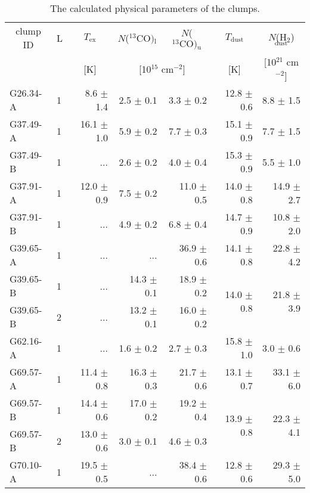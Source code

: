\documentclass[printer]{aa}
\begin{document}
\begin{table*}[t]
	\centering
	\footnotesize
		\caption{The calculated physical parameters of the clumps.}
		\begin{tabular}{l l r r r r r}
		\hline
		\multicolumn{1}{c}{clump ID} & \multicolumn{1}{c}{L} & \multicolumn{1}{c}{$T\mathrm{_{ex}}$} & \multicolumn{1}{c}{$N$($\mathrm{^{13}CO})\mathrm{_{l}}$} & \multicolumn{1}{c}{$N$($\mathrm{^{13}CO})\mathrm{_{u}}$} & \multicolumn{1}{c}{$T\mathrm{_{dust}}$} & \multicolumn{1}{c}{$N$(H$_2$)$\mathrm{_{dust}}$} \\
	\multicolumn{1}{c}{\ } & \multicolumn{1}{c}{\ } &  \multicolumn{1}{c}{[K]} & \multicolumn{2}{c}{[10$^{15}$ cm$^{-2}$]} & \multicolumn{1}{c}{[K]} & \multicolumn{1}{c}{[10$^{21}$ cm$^{-2}$]} \\
		\hline
		\hline
G26.34-A & 1 &  8.6 $\pm$ 1.4 &  2.5 $\pm$ 0.1 &  3.3 $\pm$ 0.2 & 12.8 $\pm$ 0.6 &  8.8 $\pm$  1.5 \\
G37.49-A & 1 & 16.1 $\pm$ 1.0 &  5.9 $\pm$ 0.2 &  7.7 $\pm$ 0.3 & 15.1 $\pm$ 0.9 &  7.7 $\pm$  1.5 \\
G37.49-B & 1 &  ... &  2.6 $\pm$ 0.2 &  4.0 $\pm$ 0.4 & 15.3 $\pm$ 0.9 &  5.5 $\pm$  1.0 \\
G37.91-A & 1 & 12.0 $\pm$ 0.9 &  7.5 $\pm$ 0.2 & 11.0 $\pm$ 0.5 & 14.0 $\pm$ 0.8 & 14.9 $\pm$  2.7 \\
G37.91-B & 1 &  ... &  4.9 $\pm$ 0.2 &  6.8 $\pm$ 0.4 & 14.7 $\pm$ 0.9 & 10.8 $\pm$  2.0 \\
G39.65-A & 1 &  ... &  ... & 36.9 $\pm$ 0.6 & 14.1 $\pm$ 0.8 & 22.8 $\pm$  4.2 \\
G39.65-B & 1 &  ... & 14.3 $\pm$ 0.1 & 18.9 $\pm$ 0.2 & \multirow{2}{*}{14.0 $\pm$ 0.8} & \multirow{2}{*}{21.8 $\pm$  3.9} \\
G39.65-B & 2 &  ... & 13.2 $\pm$ 0.1 & 16.0 $\pm$ 0.2 & &  \\
G62.16-A & 1 &  ... &  1.6 $\pm$ 0.2 &  2.7 $\pm$ 0.3 & 15.8 $\pm$ 1.0 &  3.0 $\pm$  0.6 \\
G69.57-A & 1 & 11.4 $\pm$ 0.8 & 16.3 $\pm$ 0.3 & 21.7 $\pm$ 0.6 & 13.1 $\pm$ 0.7 & 33.1 $\pm$  6.0 \\
G69.57-B & 1 & 14.4 $\pm$ 0.6 & 17.0 $\pm$ 0.2 & 19.2 $\pm$ 0.4 & \multirow{2}{*}{13.9 $\pm$ 0.8} & \multirow{2}{*}{22.3 $\pm$  4.1} \\
G69.57-B & 2 & 13.0 $\pm$ 0.6 &  3.0 $\pm$ 0.1 &  4.6 $\pm$ 0.3 &  &  \\
G70.10-A & 1 & 19.5 $\pm$ 0.5 &  ... & 38.4 $\pm$ 0.6 & 12.8 $\pm$ 0.6 & 29.3 $\pm$  5.0 \\

\end{tabular}
\end{table*}
\end{document}

